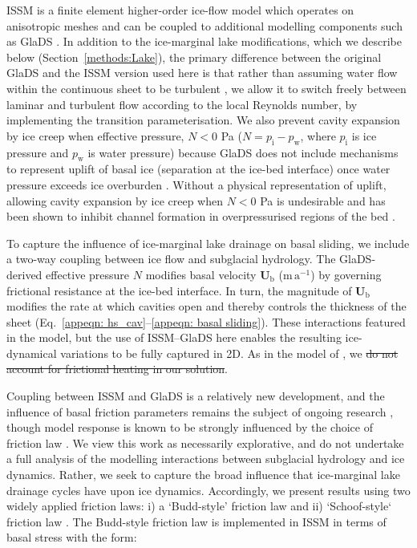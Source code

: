 \documentclass[tc, manuscript]{copernicus}
\providecommand{\DIFadd}[1]{{\protect\color{blue}\uwave{#1}}} %
\providecommand{\DIFdel}[1]{{\protect\color{red}\sout{#1}}} %
\providecommand{\DIFaddbegin}{} %
\providecommand{\DIFaddend}{} %
\providecommand{\DIFdelbegin}{} %
\providecommand{\DIFdelend}{} %
\begin{document}
ISSM is a finite element higher-order ice-flow model which operates on anisotropic meshes and can be coupled to additional modelling components such as GlaDS \citep{larour2012continental}. In addition to the ice-marginal lake modifications, which we describe below (Section~\ref{methods:Lake}), the primary difference between the original GlaDS \citep{werder2013modeling} and the ISSM version used here \citep{ehrenfeucht2023seasonal} is that rather than assuming water flow within the continuous sheet to be turbulent \citep[cf:][]{werder2013modeling}, we allow it to switch freely between laminar and turbulent flow according to the local Reynolds number, by implementing the \citet{hill2024improved} transition parameterisation. We also prevent cavity expansion by ice creep when effective pressure, $N < 0$ Pa ($N=p_{\mathrm{i}}-p_{\mathrm{w}}$, where $p_{\mathrm{i}}$ is ice pressure and $p_{\mathrm{w}}$ is water pressure) because GlaDS does not include mechanisms to represent uplift of basal ice (separation at the ice-bed interface) once water pressure exceeds ice overburden \citep[e.g.,][]{tsai2010model,schoof2012flotation,dow2015modeling}. Without a physical representation of uplift, allowing cavity expansion by ice creep when $N<0$ Pa is undesirable and has been shown to inhibit channel formation in overpressurised regions of the bed \citep{hill2024improved}.

To capture the influence of ice-marginal lake drainage on basal sliding, we include a two-way coupling between ice flow and subglacial hydrology. The GlaDS-derived effective pressure $N$ modifies basal velocity $\mathbf{U}_{\mathrm{b}}$ ($\mathrm{m}\, \mathrm{a}^{-1}$) by governing frictional resistance at the ice-bed interface. In turn, the magnitude of $\mathbf{U}_{\mathrm{b}}$ modifies the rate at which cavities open and thereby controls the thickness of the sheet (Eq.~\ref{appeqn: hs_cav}--\ref{appeqn: basal sliding}). These interactions featured in the \citet{kingslake2013modelling} model, but the use of ISSM--GlaDS here enables the resulting ice-dynamical variations to be fully captured in 2D. As in the model of \citet{kingslake2013modelling}, we \DIFdelbegin \DIFdel{do not account for frictional heating in our solution}\DIFdelend \DIFaddbegin \DIFadd{assume water exists at the pressure melting point}\DIFaddend .

Coupling between ISSM and GlaDS is a relatively new development, and the influence of basal friction parameters remains the subject of ongoing research \citep[e.g.,][]{khan2024inland,McArthur2026impact}, though model response is known to be strongly influenced by the choice of friction law \citep{choi2023impact}. We view this work as necessarily explorative, and do not undertake a full analysis of the modelling interactions between subglacial hydrology and ice dynamics. Rather, we seek to capture the broad influence that ice-marginal lake drainage cycles have upon ice dynamics. Accordingly, we present results using two widely applied friction laws: i) a `Budd-style' friction law \citep{budd1984three} and ii) `Schoof-style` friction law \citep{schoof2005effect,gagliardini2007finite}. The Budd-style friction law is implemented in ISSM in terms of basal stress with the form:
\end{document}
